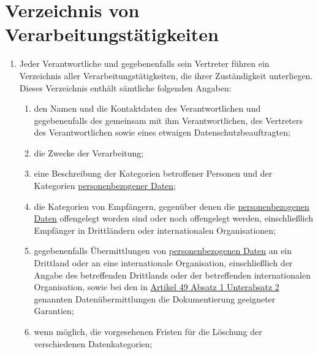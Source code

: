 \chapter{Verzeichnis von Verarbeitungstätigkeiten}
\label{ch:30}


\begin{enumerate}

  \item Jeder Verantwortliche und gegebenenfalls sein Vertreter führen ein Verzeichnis aller Verarbeitungstätigkeiten,
   die ihrer Zuständigkeit unterliegen. Dieses Verzeichnis enthält sämtliche folgenden Angaben:
  \label{itm:30-1}

  \begin{enumerate}
  
    \item den Namen und die Kontaktdaten des Verantwortlichen und gegebenenfalls des gemeinsam mit ihm Verantwortlichen,
     des Vertreters des Verantwortlichen sowie eines etwaigen Datenschutzbeauftragten;
    \label{itm:30-1a}

    \item die Zwecke der Verarbeitung;
    \label{itm:30-1b}

    \item eine Beschreibung der Kategorien betroffener Personen und der Kategorien \hyperref[itm:04-1]{personenbezogener Daten};
    \label{itm:30-1c}

    \item die Kategorien von Empfängern, gegenüber denen die \hyperref[itm:04-1]{personenbezogenen Daten} offengelegt worden sind oder noch
     offengelegt werden, einschließlich Empfänger in Drittländern oder internationalen Organisationen;
    \label{itm:30-1d}

    \item gegebenenfalls Übermittlungen von \hyperref[itm:04-1]{personenbezogenen Daten} an ein Drittland oder an eine internationale
     Organisation, einschließlich der Angabe des betreffenden Drittlands oder der betreffenden internationalen
     Organisation, sowie bei den in \hyperref[itm:49-1-2]{Artikel 49 Absatz 1 Unterabsatz 2} genannten
     Datenübermittlungen die Dokumentierung geeigneter Garantien;
    \label{itm:30-1e}

    \item wenn möglich, die vorgesehenen Fristen für die Löschung der verschiedenen Datenkategorien;
    \label{itm:30-1f}


\end{enumerate}
\end{enumerate}
